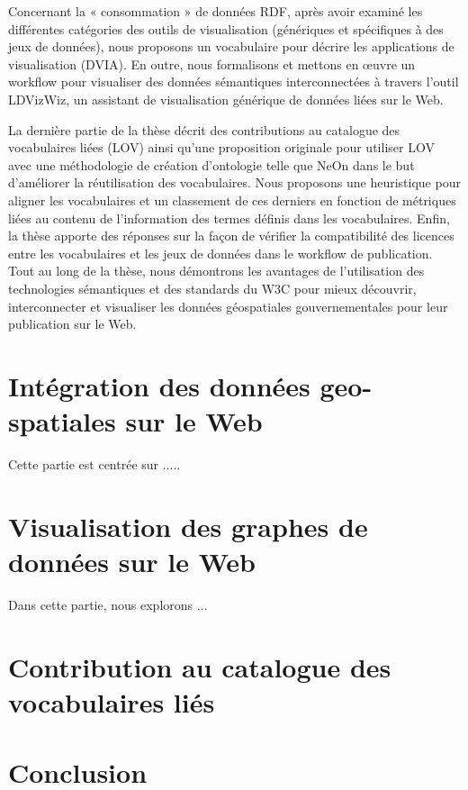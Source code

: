 \documentclass[a4paper,11pt,twoside]{report}
\begin{document}
Concernant la « consommation » de données RDF, après avoir examiné les différentes catégories des outils de visualisation (génériques et spécifiques à des jeux de données), nous proposons un vocabulaire pour décrire les applications de visualisation (DVIA). En outre, nous formalisons et mettons en œuvre un workflow pour visualiser des données sémantiques interconnectées à travers l'outil LDVizWiz, un assistant de visualisation générique de données liées sur le Web. 

La dernière partie de la thèse décrit des contributions au catalogue des vocabulaires liées (LOV) ainsi qu'une proposition originale pour utiliser LOV avec une méthodologie de création d'ontologie telle que NeOn dans le but d'améliorer la réutilisation des vocabulaires. Nous proposons une heuristique pour aligner les vocabulaires et un classement de ces derniers en fonction de métriques liées au contenu de l'information des termes définis dans les vocabulaires. Enfin, la thèse apporte des réponses sur la façon de vérifier la compatibilité des licences entre les vocabulaires et les jeux de données dans le workflow de publication. Tout au long de la thèse, nous démontrons les avantages de l'utilisation des technologies sémantiques et des standards du W3C pour mieux découvrir, interconnecter et visualiser les données géospatiales gouvernementales pour leur publication sur le Web.



\chapter*{  Intégration des données geo-spatiales sur le Web}

Cette partie est centrée sur .....

\chapter*{  Visualisation des graphes de données sur le Web}

Dans cette partie, nous explorons ...

\chapter*{  Contribution au catalogue des vocabulaires liés}



\chapter*{ Conclusion}
\end{document}
